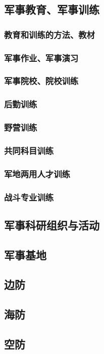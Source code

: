 \documentclass[UTF8]{../ApplicationUniverse}
\begin{document}
    \subsection{军事教育、军事训练}
        \subsubsection{教育和训练的方法、教材}
        \subsubsection{军事作业、军事演习}
        \subsubsection{军事院校、院校训练}
        \subsubsection{后勤训练}
        \subsubsection{野营训练}
        \subsubsection{共同科目训练}
        \subsubsection{军地两用人才训练}
        \subsubsection{战斗专业训练}
    \subsection{军事科研组织与活动}
    \subsection{军事基地}
    \subsection{边防}
    \subsection{海防}
    \subsection{空防}
\end{document}
